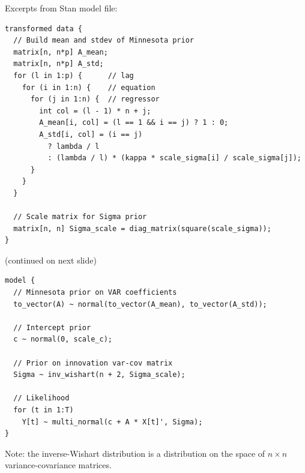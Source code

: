\begin{frame}[fragile]
Excerpts from Stan model file:
\smallskip
\scriptsize
\begin{verbatim}
transformed data {
  // Build mean and stdev of Minnesota prior
  matrix[n, n*p] A_mean;
  matrix[n, n*p] A_std;
  for (l in 1:p) {      // lag
    for (i in 1:n) {    // equation
      for (j in 1:n) {  // regressor
        int col = (l - 1) * n + j;
        A_mean[i, col] = (l == 1 && i == j) ? 1 : 0;
        A_std[i, col] = (i == j)
          ? lambda / l
          : (lambda / l) * (kappa * scale_sigma[i] / scale_sigma[j]);
      }
    }
  }

  // Scale matrix for Sigma prior
  matrix[n, n] Sigma_scale = diag_matrix(square(scale_sigma));
}
\end{verbatim}
\smallskip
\normalsize
(continued on next slide)
\end{frame}

\begin{frame}[fragile]
\scriptsize
\begin{verbatim}
model {
  // Minnesota prior on VAR coefficients
  to_vector(A) ~ normal(to_vector(A_mean), to_vector(A_std));

  // Intercept prior
  c ~ normal(0, scale_c);

  // Prior on innovation var-cov matrix
  Sigma ~ inv_wishart(n + 2, Sigma_scale);

  // Likelihood
  for (t in 1:T)
    Y[t] ~ multi_normal(c + A * X[t]', Sigma);
}
\end{verbatim}
\bigskip
\normalsize
Note: the inverse-Wishart distribution is a distribution on the space of $n \times n$ variance-covariance matrices.
\end{frame}


